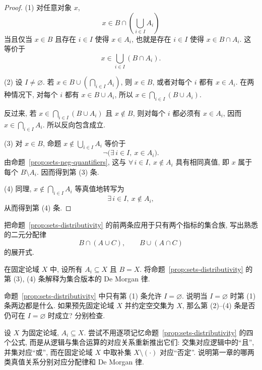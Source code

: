 \documentclass[usesamecnt, thmcnt=section, lang=cn, newtx, 10pt, scheme=chinese]{elegantbook}
\begin{document}
\begin{proof}
(1) 对任意对象 $x$,
\[
 x\in B\cap\left(\bigcup_{i\in I}A_i\right)
\]
当且仅当 $x\in B$ 且存在 $i\in I$ 使得 $x\in A_i$, 也就是存在 $i\in I$ 使得 $x\in B\cap A_i$. 这等价于
\[
 x\in\bigcup_{i\in I}(B\cap A_i).
\]

(2) 设 $I\neq\varnothing$. 若 $x\in B\cup(\bigcap_{i\in I}A_i)$, 则 $x\in B$, 或者对每个 $i$ 都有 $x\in A_i$. 在两种情况下, 对每个 $i$ 都有 $x\in B\cup A_i$, 所以 $x\in\bigcap_{i\in I}(B\cup A_i)$.

反过来, 若 $x\in\bigcap_{i\in I}(B\cup A_i)$ 且 $x\notin B$, 则对每个 $i$ 都必须有 $x\in A_i$, 因而 $x\in\bigcap_{i\in I}A_i$. 所以反向包含成立.

(3) 对 $x\in B$, 命题 $x\notin\bigcup_{i\in I}A_i$ 等价于
\[
 \neg\bigl(\exists\,i\in I,\ x\in A_i\bigr).
\]
由命题~\ref{prop:sets-neg-quantifiers}, 这与 $\forall\,i\in I,\ x\notin A_i$ 具有相同真值, 即 $x$ 属于每个 $B\setminus A_i$. 因而得到第 (3) 条.

(4) 同理, $x\notin\bigcap_{i\in I}A_i$ 等真值地转写为
\[
 \exists\,i\in I,\ x\notin A_i,
\]
从而得到第 (4) 条.
\end{proof}

\begin{exercise}\label{ex:sets-distrib-01}
把命题~\ref{prop:sets-distributivity} 的前两条应用于只有两个指标的集合族, 写出熟悉的二元分配律
\[
 B\cap(A\cup C),
 \qquad
 B\cup(A\cap C)
\]
的展开式.
\end{exercise}

\begin{exercise}\label{ex:sets-distrib-02}
在固定论域 $X$ 中, 设所有 $A_i\subseteq X$ 且 $B=X$. 将命题~\ref{prop:sets-distributivity} 的第 (3), (4) 条解释为集合版本的 De Morgan 律.
\end{exercise}

\begin{exercise}\label{ex:sets-distrib-03}
命题~\ref{prop:sets-distributivity} 中只有第 (1) 条允许 $I=\varnothing$. 说明当 $I=\varnothing$ 时第 (1) 条两边都是什么. 如果预先固定论域 $X$ 并约定空交集为 $X$, 那么第 (2)--(4) 条是否仍可在 $I=\varnothing$ 时成立? 分别检查.
\end{exercise}

\begin{challenge}\label{ch:sets-06}
设 $X$ 为固定论域, $A_i\subseteq X$. 尝试不用逐项记忆命题~\ref{prop:sets-distributivity} 的四个公式, 而是从逻辑与集合运算的对应关系重新推出它们: 交集对应逻辑中的``且'', 并集对应``或'', 而在固定论域 $X$ 中取补集 $X\setminus(\cdot)$ 对应``否定''.
说明第一章的哪两类真值关系分别对应分配律和 De Morgan 律.
\end{challenge}
\end{document}
